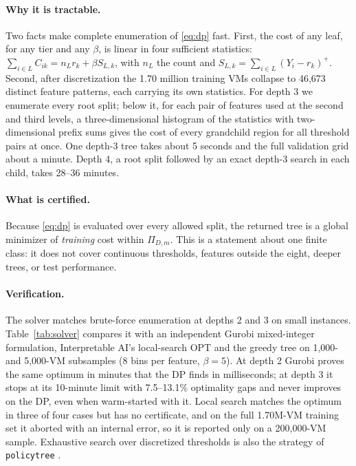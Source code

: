 \documentclass[10pt]{article}
\begin{document}
\paragraph{Why it is tractable.} Two facts make complete enumeration of \eqref{eq:dp} fast. First, the cost of any leaf, for any tier and any $\beta$, is linear in four sufficient statistics: $\sum_{i\in L}C_{ik}=n_Lr_k+\beta S_{L,k}$, with $n_L$ the count and $S_{L,k}=\sum_{i\in L}(Y_i-r_k)^+$. Second, after discretization the 1.70 million training VMs collapse to 46,673 distinct feature patterns, each carrying its own statistics. For depth 3 we enumerate every root split; below it, for each pair of features used at the second and third levels, a three-dimensional histogram of the statistics with two-dimensional prefix sums gives the cost of every grandchild region for all threshold pairs at once. One depth-3 tree takes about 5 seconds and the full validation grid about a minute. Depth 4, a root split followed by an exact depth-3 search in each child, takes 28--36 minutes.

\paragraph{What is certified.} Because \eqref{eq:dp} is evaluated over every allowed split, the returned tree is a global minimizer of \emph{training} cost within $\Pi_{D,m}$. This is a statement about one finite class: it does not cover continuous thresholds, features outside the eight, deeper trees, or test performance.

\paragraph{Verification.} The solver matches brute-force enumeration at depths 2 and 3 on small instances. Table~\ref{tab:solver} compares it with an independent Gurobi mixed-integer formulation, Interpretable AI's local-search OPT \citep{iai} and the greedy tree on 1,000- and 5,000-VM subsamples (8 bins per feature, $\beta=5$). At depth 2 Gurobi proves the same optimum in minutes that the DP finds in milliseconds; at depth 3 it stops at its 10-minute limit with 7.5--13.1\% optimality gaps and never improves on the DP, even when warm-started with it. Local search matches the optimum in three of four cases but has no certificate, and on the full 1.70M-VM training set it aborted with an internal error, so it is reported only on a 200,000-VM sample. Exhaustive search over discretized thresholds is also the strategy of \texttt{policytree} \citep{sverdrup2020policytree,zhou2023offline}.
\end{document}
